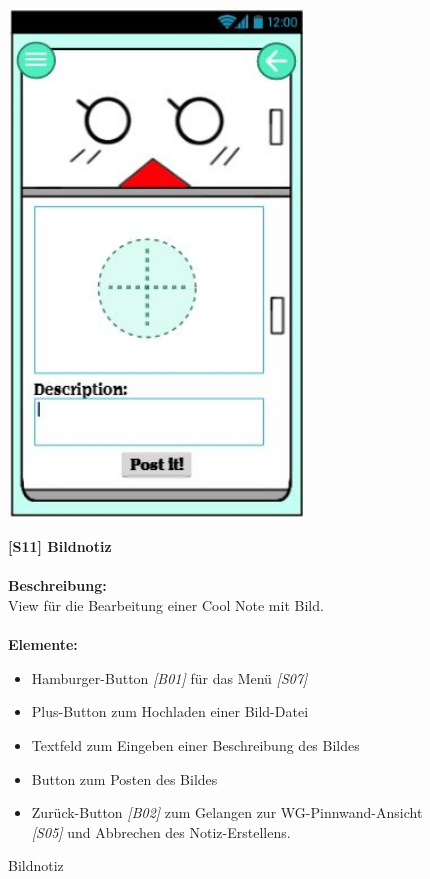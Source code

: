 \documentclass[a4paper]{scrreprt}
\begin{document}
    	\begin{figure}[h]
    		\begin{minipage}[b]{0.35\linewidth}
    			\flushright
    			\centering
    			\includegraphics[width=0.7\textwidth]{fridget_picnote.JPG}
    			\caption{Bildnotiz}
    			\label{fig:figure1}
    			\vspace{43mm}
    		\end{minipage}
    		\hspace{0.5cm}
    		\begin{minipage}[b]{0.65\linewidth}
    			\flushleft
    			\textbf{{[}S11{]} Bildnotiz} \\
    			\hfill
    			\\\textbf{Beschreibung:} \\
    			View für die Bearbeitung einer Cool Note mit
    			Bild.\\
    			
    			\hfill 
    			\\\textbf{Elemente:}
    			\begin{itemize}
    				\renewcommand\labelitemi{--}
    				\item Hamburger-Button \textit{{[}B01{]}} für das Menü \textit{{[}S07{]}}
    				\item Plus-Button zum Hochladen einer Bild-Datei
    				\item Textfeld zum Eingeben einer Beschreibung des 
    				Bildes
    				\item Button zum Posten des Bildes
    				\item Zurück-Button \textit{{[}B02{]}} zum Gelangen zur
    				WG-Pinnwand-Ansicht \textit{{[}S05{]}} und Abbrechen des Notiz-Erstellens.
    				

\end{itemize}
\end{minipage}
\end{figure}
\end{document}
